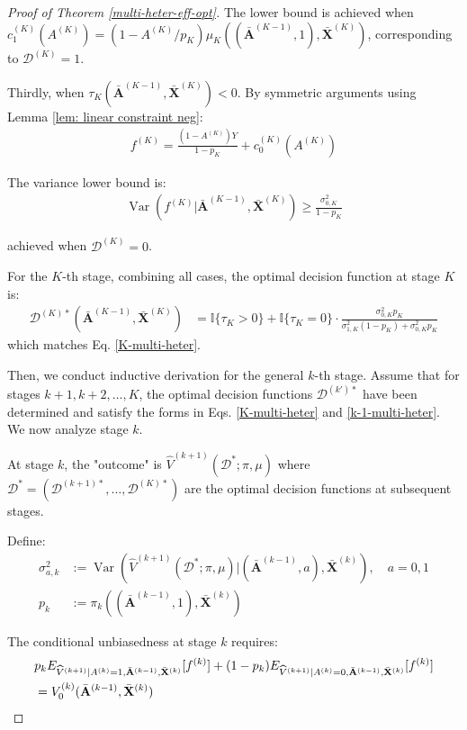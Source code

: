 \documentclass[11pt]{article}
\theoremstyle{referenceplain}
\theoremstyle{referencedefinition}
\theoremstyle{referenceremark}
\begin{document}
\begin{proof}[Proof of Theorem \ref{multi-heter-eff-opt}]
The lower bound is achieved when $c_1^{(K)}(A^{(K)}) = (1 - A^{(K)}/p_K) \mu_K((\bar{\mathbf{A}}^{(K-1)}, 1), \bar{\mathbf{X}}^{(K)})$, corresponding to $\mathcal{D}^{(K)} = 1$.

Thirdly, when $\tau_K(\bar{\mathbf{A}}^{(K-1)}, \bar{\mathbf{X}}^{(K)}) < 0$. By symmetric arguments using Lemma \ref{lem: linear constraint neg}:
\begin{align}\label{multi-f-K-tau-}
    f^{(K)} = \frac{(1-A^{(K)}) Y}{1-p_K} + c_0^{(K)}(A^{(K)})
\end{align}

The variance lower bound is:
\begin{align}
    \operatorname{Var}(f^{(K)} | \bar{\mathbf{A}}^{(K-1)}, \bar{\mathbf{X}}^{(K)}) \geq \frac{\sigma_{0,K}^2}{1-p_K} \label{multi-var-lb-K-tau-}
\end{align}

achieved when $\mathcal{D}^{(K)} = 0$.

For the $K$-th stage, combining all cases, the optimal decision function at stage $K$ is:
\begin{align}
    \mathcal{D}^{(K)*}(\bar{\mathbf{A}}^{(K-1)}, \bar{\mathbf{X}}^{(K)}) &= \mathbb{I}\{\tau_K > 0\} + \mathbb{I}\{\tau_K = 0\} \cdot \frac{\sigma_{0,K}^2 p_K}{\sigma_{1,K}^2 (1-p_K) + \sigma_{0,K}^2 p_K}
\end{align}
which matches Eq. \eqref{K-multi-heter}.

Then, we conduct inductive derivation for the general $k$-th stage. Assume that for stages $k+1, k+2, \ldots, K$, the optimal decision functions $\mathcal{D}^{(k')*}$ have been determined and satisfy the forms in Eqs. \eqref{K-multi-heter} and \eqref{k-1-multi-heter}. We now analyze stage $k$.

At stage $k$, the "outcome" is $\widehat{V}^{(k+1)}(\mathcal{D}^*; \pi, \mu)$ where $\mathcal{D}^* = (\mathcal{D}^{(k+1)*}, \ldots, \mathcal{D}^{(K)*})$ are the optimal decision functions at subsequent stages.

Define:
\begin{align}
    \sigma_{a,k}^2 &:= \operatorname{Var}(\widehat{V}^{(k+1)}(\mathcal{D}^*; \pi, \mu) | (\bar{\mathbf{A}}^{(k-1)}, a), \bar{\mathbf{X}}^{(k)}), \quad a = 0, 1 \label{multi-sigma-k}\\
    p_k &:= \pi_k((\bar{\mathbf{A}}^{(k-1)}, 1), \bar{\mathbf{X}}^{(k)}) \label{multi-p-k}
\end{align}

The conditional unbiasedness at stage $k$ requires:
\begin{align}\label{multi-unbias-k}
    &p_k E_{\widehat{V}^{(k+1)}|A^{(k)}=1, \bar{\mathbf{A}}^{(k-1)}, \bar{\mathbf{X}}^{(k)}}[f^{(k)}] + (1-p_k) E_{\widehat{V}^{(k+1)}|A^{(k)}=0, \bar{\mathbf{A}}^{(k-1)}, \bar{\mathbf{X}}^{(k)}}[f^{(k)}] \notag\\
    &= V_0^{(k)}(\bar{\mathbf{A}}^{(k-1)}, \bar{\mathbf{X}}^{(k)})
\end{align}


\end{proof}
\end{document}
